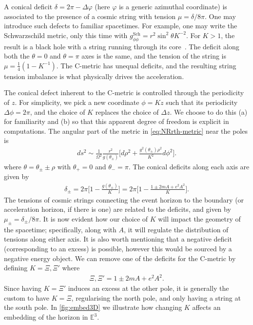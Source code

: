 \documentclass[
twoside,
openright,
frontopenright,
]{dmathesis}
\begin{document}
A conical deficit $\delta = 2\pi - \Delta \varphi$ (here $\varphi$ is a generic
azimuthal coordinate) is associated to the presence of a cosmic string with
tension $\mu = \delta/8\pi$. One may introduce such defects to familiar
spacetimes. For example, one may write the Schwarzschild metric, only this time
with $g^{\mathrm{Sch}}_{\phi\phi}= r^2\sin^2\theta K^{-2}$. For $K>1$, the
result is a black hole with a string running through its
core~\cite{Aryal:1986sz}. The deficit along both the $\theta = 0$ and
$\theta= \pi$ axes is the same, and the tension of the string is
$\mu=\frac14(1-K^{-1})$. The C-metric has unequal deficits, and the resulting
string tension imbalance is what physically drives the acceleration.

The conical defect inherent to the C-metric is controlled through the
periodicity of $z$. For simplicity, we pick a new coordinate $\phi = K z$ such
that its periodicity $\Delta\phi=2\pi$, and the choice of $K$ replaces the
choice of $\Delta z$. We choose to do this (a) for familiarity and (b) so that
this apparent degree of freedom is explicit in computations. The angular part of
the metric in \cref{eq:NRrth-metric} near the poles is
\begin{align}
ds^2 \sim \frac{1}{\Omega^2}\frac{r^2}{g(\theta_{\pm})}\bigg[d\rho^2 +
  \frac{g^2(\theta_{\pm}) \rho^{2}}{K^2}d\phi^2\bigg]. 
\end{align}
where $\theta = \theta_{\pm} \pm \rho$ with $\theta_+=0$ and $\theta_-=\pi$. The
conical deficits along each axis are given by 
\begin{align}
  \label{eq:deficitsNR}
  \delta_\pm=2\pi\bigg[1-\frac{g(\theta_\pm)}{K}\bigg] = 2\pi\bigg[1-\frac{1\pm
  2mA + e^2A^2}{K}\bigg]. 
\end{align} 
The tensions of cosmic strings connecting the event horizon to the boundary (or
acceleration horizon, if there is one) are related to the deficits, and given by
$\mu_\pm=\delta_\pm/8\pi$. It is now evident how our choice of $K$ will impact
the geometry of the spacetime; specifically, along with $A$, it will regulate
the distribution of tensions along either axis. It is also worth mentioning that
a negative deficit (corresponding to an excess) is possible, however this would
be sourced by a negative energy object. We can remove one of the deficits for
the C-metric by defining $K=\Xi, \Xi'$ where
\begin{align}
\Xi, \Xi'=1\pm 2mA + e^2A^2.
\end{align}
Since having $K=\Xi'$ induces an excess at the other pole, it is generally the
custom to have $K=\Xi$, regularising the north pole, and only having a string at
the south pole. In \cref{fig:embed3D} we illustrate how changing $K$ affects an
embedding of the horizon in $\mathbb{E}^3$. 
\end{document}
